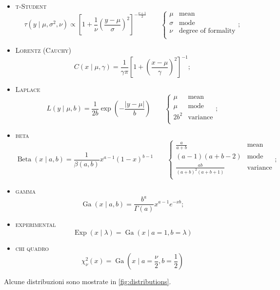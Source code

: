 \documentclass[10pt]{article}
\DeclareMathOperator{\Beta}{Beta}
\DeclareMathOperator{\Ga}{Ga}
\DeclareMathOperator{\Exp}{Exp}
\newcommand{\im}[1]{\textsc{#1}}
\newcommand{\cond}{\mid}
\newcommand{\pare}[1]{
	\ensuremath{\left(#1\right)}
}
\newcommand{\spare}[1]{
	\ensuremath{\left[#1\right]}
}
\theoremstyle{definition}
\begin{document}
\begin{itemize}
\item \im{t-Student} \begin{equation}
\tau\pare{y\cond\mu, \sigma^2, \nu} \propto \spare{1 + \frac{1}{\nu}\pare{\frac{y-\mu}{\sigma}}^2}^{-\frac{\nu+1}{2}}
\qquad\left\{\begin{array}{ll}
\mu & \text{mean} \\
\sigma & \text{mode} \\
\nu & \text{degree of formality} \\
\end{array}\right.;
\end{equation}
\item \im{Lorentz (Cauchy)} \begin{equation}
C\pare{x\cond\mu, \gamma} = \frac{1}{\gamma\pi}\spare{1 + \pare{\frac{x-\mu}{\gamma}}^2}^{-1};
\end{equation}
\item \im{Laplace} \begin{equation}
L\pare{y\cond\mu, b} = \frac{1}{2b}\exp\pare{-\frac{\left|y-\mu\right|}{b}}
\qquad\left\{\begin{array}{ll}
\mu & \text{mean} \\
\mu & \text{mode} \\
2b^2 & \text{variance} \\
\end{array}\right.;
\end{equation}
\item \im{beta} \begin{equation}
\Beta\pare{x\cond a, b} = \frac{1}{\beta\pare{a, b}}x^{a-1}\pare{1-x}^{b-1}
\qquad\left\{\begin{array}{ll}
\frac{a}{a+b} & \text{mean} \\
\pare{a-1}\pare{a+b-2} & \text{mode} \\
\frac{ab}{\pare{a+b}^2\pare{a+b+1}} & \text{variance} \\
\end{array}\right.;
\end{equation}
\item \im{gamma} \begin{equation}
\Ga\pare{x\cond a, b} = \frac{b^a}{\Gamma\pare{a}}x^{a-1}e^{-xb};
\end{equation}
\item \im{experimental} \begin{equation}
\Exp\pare{x\cond\lambda} = \Ga\pare{x\cond a=1, b=\lambda}
\end{equation}
\item \im{chi quadro} \begin{equation}
\chi^2_\nu\pare{x} = \Ga\pare{x\cond a=\frac{\nu}{2}, b=\frac{1}{2}}
\end{equation}
\end{itemize}
Alcune distribuzioni sono mostrate in \cref{fig:distributions}.
\end{document}
